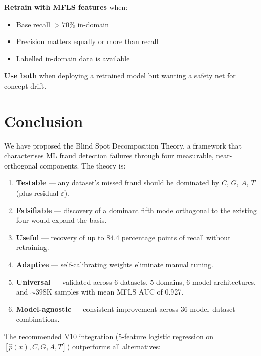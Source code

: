 \documentclass[journal]{IEEEtran}
\begin{document}
\textbf{Retrain with MFLS features} when:
\begin{itemize}
  \item Base recall $>70\%$ in-domain
  \item Precision matters equally or more than recall
  \item Labelled in-domain data is available
\end{itemize}

\textbf{Use both} when deploying a retrained model but wanting a safety net for concept drift.

\section{Conclusion}
\label{sec:conclusion}

We have proposed the Blind Spot Decomposition Theory, a framework that characterises ML fraud detection failures through four measurable, near-orthogonal components. The theory is:

\begin{enumerate}
  \item \textbf{Testable} --- any dataset's missed fraud should be dominated by $C$, $G$, $A$, $T$ (plus residual $\varepsilon$).
  \item \textbf{Falsifiable} --- discovery of a dominant fifth mode orthogonal to the existing four would expand the basis.
  \item \textbf{Useful} --- recovery of up to 84.4 percentage points of recall without retraining.
  \item \textbf{Adaptive} --- self-calibrating weights eliminate manual tuning.
  \item \textbf{Universal} --- validated across 6 datasets, 5 domains, 6 model architectures, and ${\sim}398$K samples with mean MFLS AUC of 0.927.
  \item \textbf{Model-agnostic} --- consistent improvement across 36 model--dataset combinations.
\end{enumerate}

The recommended V10 integration (5-feature logistic regression on $[\hat{p}(x), C, G, A, T]$) outperforms all alternatives:
\end{document}
